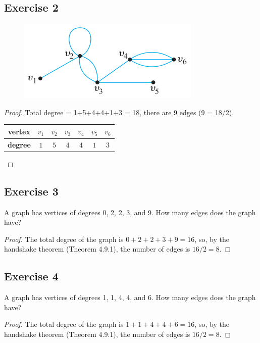 \documentclass[14pt]{extarticle}
\begin{document}
\subsection{Exercise 2}
\begin{figure}[ht!]
\centering
\includegraphics[scale=0.5]{../images/4.9.2.png}
\end{figure}

\begin{proof}
Total degree = 1+5+4+4+1+3 = 18, there are 9 edges (9 = 18/2).
\begin{center}
\begin{tabular}{|c|c|c|c|c|c|c|}
\hline
{\bf vertex} & $v_1$ & $v_2$ & $v_3$ & $v_4$ & $v_5$ & $v_6$ \\
\hline
{\bf degree} & $1$ & $5$ & $4$ & $4$ & $1$ & $3$ \\
\hline
\end{tabular}
\end{center}
\end{proof}

\subsection{Exercise 3}
A graph has vertices of degrees 0, 2, 2, 3, and 9. How many edges does the graph have?

\begin{proof}
The total degree of the graph is $0 + 2 + 2 + 3 + 9 = 16$, so, by the handshake theorem (Theorem 4.9.1), the number of edges is $16/2 = 8$.
\end{proof}

\subsection{Exercise 4}
A graph has vertices of degrees 1, 1, 4, 4, and 6.
How many edges does the graph have?

\begin{proof}
The total degree of the graph is $1 + 1 + 4 + 4 + 6 = 16$, so, by the handshake theorem (Theorem 4.9.1), the number of edges is $16/2 = 8$.
\end{proof}
\end{document}

